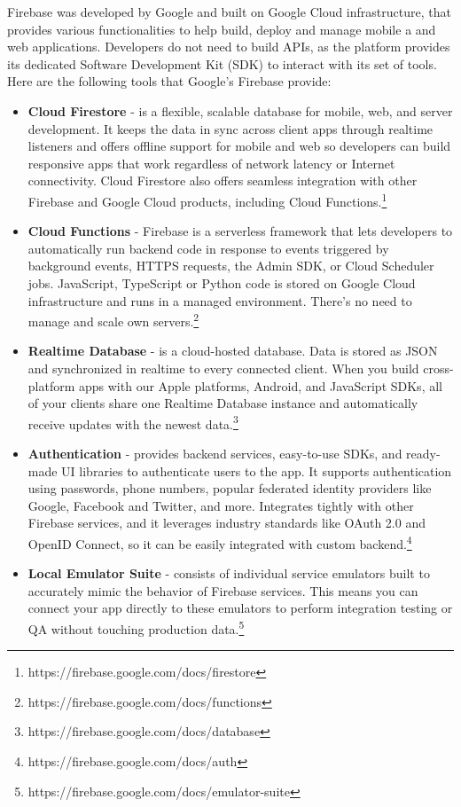 Firebase was developed by Google and built on Google Cloud infrastructure, that provides various functionalities to help build, deploy and manage mobile a and web applications.
Developers do not need to build APIs, as the platform provides its dedicated Software Development Kit (SDK) to interact with its set of tools. Here are the following tools that Google's Firebase provide:

\begin{itemize}
	\item \textbf{Cloud Firestore} - is a flexible, scalable database for mobile, web, and server development. It keeps the data in sync across client apps through realtime listeners and offers offline support for mobile and web so developers can build responsive apps that work regardless of network latency or Internet connectivity. Cloud Firestore also offers seamless integration with other Firebase and Google Cloud products, including Cloud Functions.\footnote{https://firebase.google.com/docs/firestore}
	\item \textbf{Cloud Functions} - Firebase is a serverless framework that lets developers to automatically run backend code in response to events triggered by background events, HTTPS requests, the Admin SDK, or Cloud Scheduler jobs. JavaScript, TypeScript or Python code is stored on Google Cloud infrastructure and runs in a managed environment. There's no need to manage and scale own servers.\footnote{https://firebase.google.com/docs/functions}
	\item \textbf{Realtime Database} - is a cloud-hosted database. Data is stored as JSON and synchronized in realtime to every connected client. When you build cross-platform apps with our Apple platforms, Android, and JavaScript SDKs, all of your clients share one Realtime Database instance and automatically receive updates with the newest data.\footnote{https://firebase.google.com/docs/database}
	\item \textbf{Authentication} - provides backend services, easy-to-use SDKs, and ready-made UI libraries to authenticate users to the app. It supports authentication using passwords, phone numbers, popular federated identity providers like Google, Facebook and Twitter, and more. Integrates tightly with other Firebase services, and it leverages industry standards like OAuth 2.0 and OpenID Connect, so it can be easily integrated with custom backend.\footnote{https://firebase.google.com/docs/auth}
	\item \textbf{Local Emulator Suite} - consists of individual service emulators built to accurately mimic the behavior of Firebase services. This means you can connect your app directly to these emulators to perform integration testing or QA without touching production data.\footnote{https://firebase.google.com/docs/emulator-suite}

\end{itemize}
